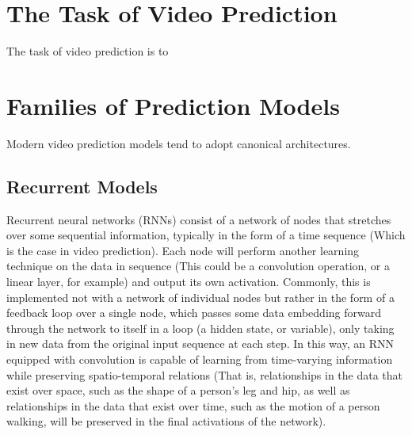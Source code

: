 \documentclass{scrartcl}
\begin{document}

\section{The Task of Video Prediction}
\label{sec:task}

The task of video prediction is to 

\section{Families of Prediction Models}
\label{sec:families}

Modern video prediction models tend to adopt canonical architectures.

\subsection{Recurrent Models}
\label{subsec:recurrent}

Recurrent neural networks (RNNs) consist of a network of nodes that stretches
over some sequential information, typically in the form of a time sequence
(Which is the case in video prediction). Each node will perform another
learning technique on the data in sequence (This could be a convolution
operation, or a linear layer, for example) and output its own activation.
Commonly, this is implemented not with a network of individual nodes but rather
in the form of a feedback loop over a single node, which passes some data
embedding forward through the network to itself in a loop (a hidden state, or
variable), only taking in new data from the original input sequence at each
step. In this way, an RNN equipped with convolution is capable of learning from
time-varying information while preserving spatio-temporal relations (That is,
relationships in the data that exist over space, such as the shape of a
person's leg and hip, as well as relationships in the data that exist over
time, such as the motion of a person walking, will be preserved in the
final activations of the network).
\end{document}
